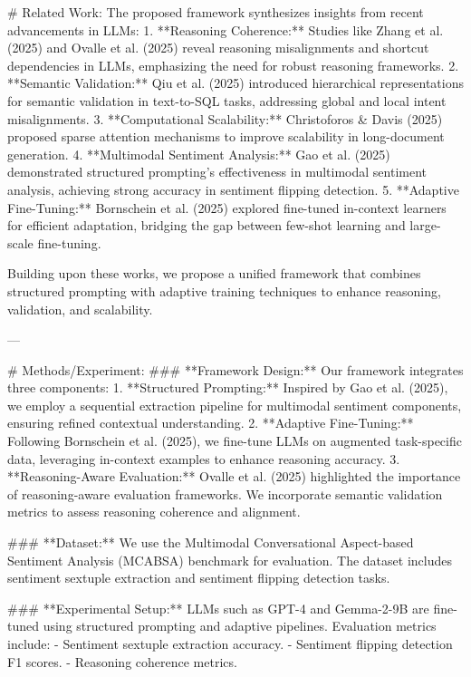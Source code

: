 # Related Work:
The proposed framework synthesizes insights from recent advancements in LLMs:
1. **Reasoning Coherence:** Studies like Zhang et al. (2025) and Ovalle et al. (2025) reveal reasoning misalignments and shortcut dependencies in LLMs, emphasizing the need for robust reasoning frameworks.
2. **Semantic Validation:** Qiu et al. (2025) introduced hierarchical representations for semantic validation in text-to-SQL tasks, addressing global and local intent misalignments.
3. **Computational Scalability:** Christoforos & Davis (2025) proposed sparse attention mechanisms to improve scalability in long-document generation.
4. **Multimodal Sentiment Analysis:** Gao et al. (2025) demonstrated structured prompting's effectiveness in multimodal sentiment analysis, achieving strong accuracy in sentiment flipping detection.
5. **Adaptive Fine-Tuning:** Bornschein et al. (2025) explored fine-tuned in-context learners for efficient adaptation, bridging the gap between few-shot learning and large-scale fine-tuning.

Building upon these works, we propose a unified framework that combines structured prompting with adaptive training techniques to enhance reasoning, validation, and scalability.

---

# Methods/Experiment:
### **Framework Design:**
Our framework integrates three components:
1. **Structured Prompting:** Inspired by Gao et al. (2025), we employ a sequential extraction pipeline for multimodal sentiment components, ensuring refined contextual understanding.
2. **Adaptive Fine-Tuning:** Following Bornschein et al. (2025), we fine-tune LLMs on augmented task-specific data, leveraging in-context examples to enhance reasoning accuracy.
3. **Reasoning-Aware Evaluation:** Ovalle et al. (2025) highlighted the importance of reasoning-aware evaluation frameworks. We incorporate semantic validation metrics to assess reasoning coherence and alignment.

### **Dataset:**
We use the Multimodal Conversational Aspect-based Sentiment Analysis (MCABSA) benchmark for evaluation. The dataset includes sentiment sextuple extraction and sentiment flipping detection tasks.

### **Experimental Setup:**
LLMs such as GPT-4 and Gemma-2-9B are fine-tuned using structured prompting and adaptive pipelines. Evaluation metrics include:
- Sentiment sextuple extraction accuracy.
- Sentiment flipping detection F1 scores.
- Reasoning coherence metrics.

